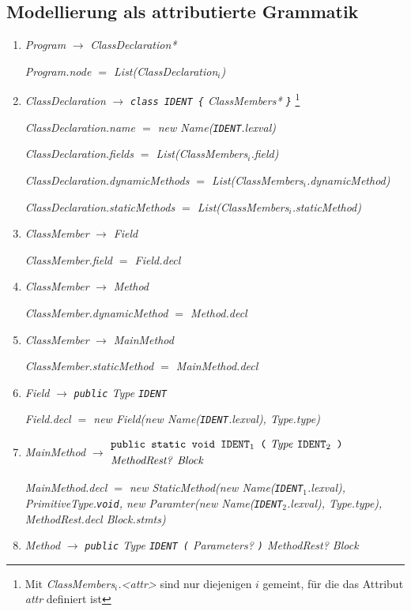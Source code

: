 \documentclass[12pt,a4paper]{scrartcl}
\renewcommand{\prod}[2]{\textit{#1} $\rightarrow$ \textit{#2}}
\newcommand{\tok}[1]{\textnormal{\texttt{#1}}}
\newcommand{\assign}[2]{\textit{#1} $=$ #2}
\newcommand{\List}[1]{\textnormal{List(\textit{#1})}}
\newcommand{\new}[2]{\textnormal{new #1(\textit{#2})}}
\newcommand{\attr}[1]{\parbox{\linewidth}{\raggedleft \textit{#1}}}
\begin{document}
\newpage
\subsection{Modellierung als attributierte Grammatik}

\begin{enumerate}
    \item \prod{Program}{ClassDeclaration*}\\
        \attr{\assign{Program.node}{\List{ClassDeclaration$_i$}}}
    \item \prod{ClassDeclaration}{\tok{class IDENT \{} ClassMembers* \tok{\}}}
        \footnote{Mit \textit{ClassMembers$_i$.<attr>} sind nur diejenigen $i$ gemeint, für die das Attribut \textit{attr} definiert ist}\\
        \attr{\assign{ClassDeclaration.name}{\new{Name}{\tok{IDENT}.lexval}}}
        \attr{\assign{ClassDeclaration.fields}{\List{ClassMembers$_i$.field}}}
        \attr{\assign{ClassDeclaration.dynamicMethods}{\List{ClassMembers$_i$.dynamicMethod}}}
        \attr{\assign{ClassDeclaration.staticMethods}{\List{ClassMembers$_i$.staticMethod}}}
    \item \prod{ClassMember}{Field}\\
        \attr{\assign{ClassMember.field}{Field.decl}}
    \item \prod{ClassMember}{Method}\\
        \attr{\assign{ClassMember.dynamicMethod}{Method.decl}}
    \item \prod{ClassMember}{MainMethod}\\
        \attr{\assign{ClassMember.staticMethod}{MainMethod.decl}}
    \item \prod{Field}{\tok{public} Type \tok{IDENT}}\\
        \attr{\assign{Field.decl}{\new{Field}{\new{Name}{\tok{IDENT}.lexval}, Type.type}}}
    \item \textit{MainMethod} $\rightarrow$
        $\begin{aligned} &\textit{\tok{public static void IDENT$_1$ (} Type \tok{IDENT$_2$ )}} \\
                         &\textit{MethodRest? Block} \end{aligned}$\\
        \attr{\assign{MainMethod.decl}{\new{StaticMethod}{\new{Name}{\tok{IDENT$_1$}.lexval}, PrimitiveType.\tok{void}, \new{Paramter}{\new{Name}{\tok{IDENT}$_2$.lexval}, Type.type}, MethodRest.decl Block.stmts}}}
    \item \prod{Method}{\tok{public} Type \tok{IDENT (} Parameters? \tok{)} MethodRest? Block}

\end{enumerate}
\end{document}
